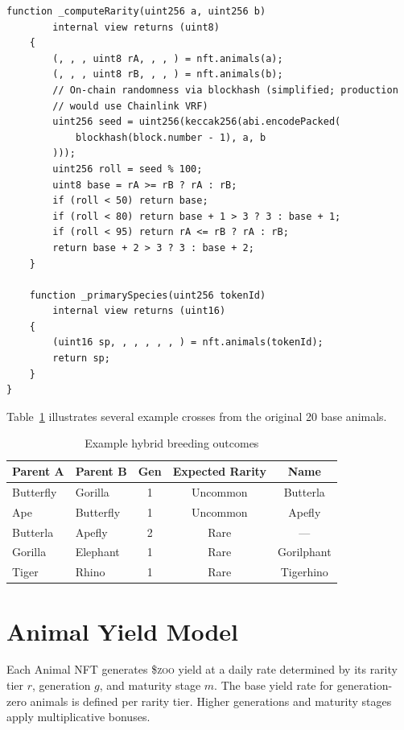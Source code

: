 \documentclass[11pt,letterpaper]{article}
\newcommand{\ZOO}{\$\textsc{zoo}}
\begin{document}
\begin{lstlisting}[language=Solidity,caption={BreedingRegistry: hybrid genetics and cool-downs}]
    function _computeRarity(uint256 a, uint256 b)
        internal view returns (uint8)
    {
        (, , , uint8 rA, , , ) = nft.animals(a);
        (, , , uint8 rB, , , ) = nft.animals(b);
        // On-chain randomness via blockhash (simplified; production
        // would use Chainlink VRF)
        uint256 seed = uint256(keccak256(abi.encodePacked(
            blockhash(block.number - 1), a, b
        )));
        uint256 roll = seed % 100;
        uint8 base = rA >= rB ? rA : rB;
        if (roll < 50) return base;
        if (roll < 80) return base + 1 > 3 ? 3 : base + 1;
        if (roll < 95) return rA <= rB ? rA : rB;
        return base + 2 > 3 ? 3 : base + 2;
    }

    function _primarySpecies(uint256 tokenId)
        internal view returns (uint16)
    {
        (uint16 sp, , , , , , ) = nft.animals(tokenId);
        return sp;
    }
}
\end{lstlisting}

Table~\ref{tab:breeding} illustrates several example crosses from the original 20 base
animals.

\begin{table}[ht]
\centering
\caption{Example hybrid breeding outcomes}
\label{tab:breeding}
\begin{tabular}{llccc}
\toprule
Parent A & Parent B & Gen & Expected Rarity & Name \\
\midrule
Butterfly & Gorilla   & 1 & Uncommon & Butterla \\
Ape       & Butterfly & 1 & Uncommon & Apefly \\
Butterla  & Apefly    & 2 & Rare     & --- \\
Gorilla   & Elephant  & 1 & Rare     & Gorilphant \\
Tiger     & Rhino     & 1 & Rare     & Tigerhino \\
\bottomrule
\end{tabular}
\end{table}

\section{Animal Yield Model}
\label{sec:yield}

Each Animal NFT generates \ZOO{} yield at a daily rate determined by its rarity tier $r$,
generation $g$, and maturity stage $m$.  The base yield rate for generation-zero animals is
defined per rarity tier.  Higher generations and maturity stages apply multiplicative bonuses.
\end{document}
